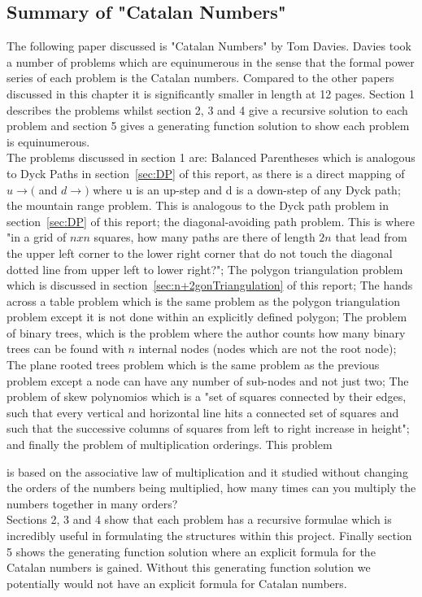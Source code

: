 \documentclass[12pt]{article}
\begin{document}
\subsection{Summary of "Catalan Numbers"}
The following paper discussed is "Catalan Numbers" by Tom Davies. \cite{CataNumDavies} Davies took a number of problems which are equinumerous in the sense that the formal power series of each problem is the Catalan numbers. Compared to the other papers discussed in this chapter it is significantly smaller in length at 12 pages. Section 1 describes the problems whilst section 2, 3 and 4 give a recursive solution to each problem and section 5 gives a generating function solution to show each problem is equinumerous.\\
The problems discussed in section 1 are: Balanced Parentheses which is analogous to Dyck Paths in section~\ref{sec:DP} of this report, as there is a direct mapping of $u \rightarrow ($ and $d \rightarrow )$ where u is an up-step and d is a down-step of any Dyck path; the mountain range problem. This is analogous to the Dyck path problem in section~\ref{sec:DP} of this report; the diagonal-avoiding path problem. This is where "in a grid of $nxn$ squares, how many paths are there of length $2n$ that lead from the upper left corner to the lower right corner that do not touch the diagonal dotted line from upper left to lower right?"; The polygon triangulation problem which is discussed in section~\ref{sec:n+2gonTriangulation} of this report; The hands across a table problem which is the same problem as the polygon triangulation problem except it is not done within an explicitly defined polygon; The problem of binary trees, which is the problem where the author counts how many binary trees can be found with $n$ internal nodes (nodes which are not the root node); The plane rooted trees problem which is the same problem as the previous problem except a node can have any number of sub-nodes and not just two; The problem of skew polynomios which is a "set of squares connected by their edges, such that every vertical and horizontal line hits a connected set of squares and such that the successive columns of squares from left to right increase in height"; and finally the problem of multiplication orderings. This problem\newtheorem{mydef}{Definition} is based on the associative law of multiplication and it studied without changing the orders of the numbers being multiplied, how many times can you multiply the numbers together in many orders?\\
Sections 2, 3 and 4 show that each problem has a recursive formulae which is incredibly useful in formulating the structures within this project. Finally section 5 shows the generating function solution where an explicit formula for the Catalan numbers is gained. Without this generating function solution we potentially would not have an explicit formula for Catalan numbers.
\end{document}
